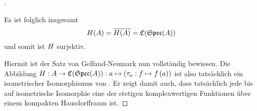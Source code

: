 \begin{proof}[]
\begin{itemize}
Es ist folglich insgesamt
	\[H(A) = \overline{H(A)} = \mathfrak{C}(\mathfrak{Spec}(A))\]
und somit ist $H$ surjektiv.
\end{itemize}

Hiermit ist der Satz von Gelfand-Neumark nun vollständig bewiesen. Die Abbildung $H: A \to \mathfrak{C}(\mathfrak{Spec}(A)): a \mapsto \left(\tau_a: f \mapsto f\left(a\right)\right)$ ist also tatsächlich ein isometrischer Isomorphismus von \CAlgn. Er zeigt damit auch, dass tatsächlich jede \CAlg{} bis auf isometrische Isomorphie eine \CAlg{} der stetigen komplexwertigen Funktionen über einem kompakten Hausdorffraum ist.
\end{proof}